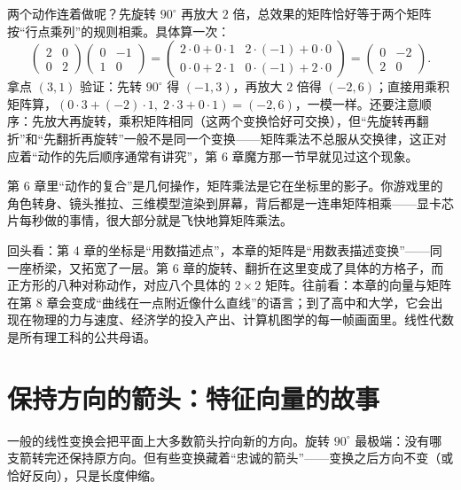 两个动作连着做呢？先旋转 $90^\circ$ 再放大 $2$ 倍，总效果的矩阵恰好等于两个矩阵按“行点乘列”的规则相乘。具体算一次：
\[
\begin{pmatrix}2&0\\0&2\end{pmatrix}\begin{pmatrix}0&-1\\1&0\end{pmatrix}
=\begin{pmatrix}2\cdot0+0\cdot1&2\cdot(-1)+0\cdot0\\0\cdot0+2\cdot1&0\cdot(-1)+2\cdot0\end{pmatrix}
=\begin{pmatrix}0&-2\\2&0\end{pmatrix}.
\]
拿点 $(3,1)$ 验证：先转 $90^\circ$ 得 $(-1,3)$，再放大 $2$ 倍得 $(-2,6)$；直接用乘积矩阵算，$(0\cdot3+(-2)\cdot1,\;2\cdot3+0\cdot1)=(-2,6)$，一模一样。还要注意顺序：先放大再旋转，乘积矩阵相同（这两个变换恰好可交换），但“先旋转再翻折”和“先翻折再旋转”一般不是同一个变换——矩阵乘法不总服从交换律，这正对应着“动作的先后顺序通常有讲究”，第 6 章魔方那一节早就见过这个现象。

第 6 章里“动作的复合”是几何操作，矩阵乘法是它在坐标里的影子。你游戏里的角色转身、镜头推拉、三维模型渲染到屏幕，背后都是一连串矩阵相乘——显卡芯片每秒做的事情，很大部分就是飞快地算矩阵乘法。

\begin{lianjie}
回头看：第 4 章的坐标是“用数描述点”，本章的矩阵是“用数表描述变换”——同一座桥梁，又拓宽了一层。第 6 章的旋转、翻折在这里变成了具体的方格子，而正方形的八种对称动作，对应八个具体的 $2\times2$ 矩阵。往前看：本章的向量与矩阵在第 8 章会变成“曲线在一点附近像什么直线”的语言；到了高中和大学，它会出现在物理的力与速度、经济学的投入产出、计算机图学的每一帧画面里。线性代数是所有理工科的公共母语。
\end{lianjie}

\section{保持方向的箭头：特征向量的故事}

一般的线性变换会把平面上大多数箭头拧向新的方向。旋转 $90^\circ$ 最极端：没有哪支箭转完还保持原方向。但有些变换藏着“忠诚的箭头”——变换之后方向不变（或恰好反向），只是长度伸缩。

